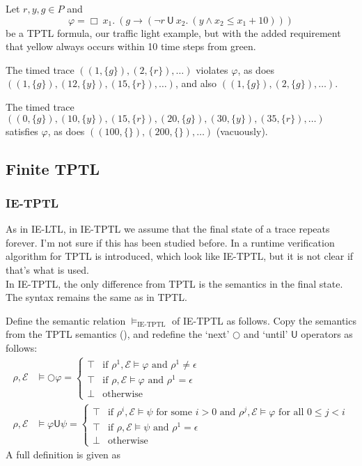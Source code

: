 \documentclass[a4paper]{article}
\newcommand{\U}{\mathsf{U}}
\newcommand{\tand}{\text{ and }}
\newcommand{\fsome}{\text{ for some }}
\newcommand{\fall}{\text{ for all }}
\newcommand{\eval}{\mathcal{E}}
\begin{document}
\begin{eg}\label{tptleg}
  Let $r,y,g\in P$ and \[\varphi = \Box ~x_1.~ (g \to (\neg r ~\U~ x_2.~ (y \land x_2 \leq x_1 + 10) ))\] be a TPTL formula, our traffic light example, but with the added requirement that yellow always occurs within 10 time steps from green.

  The timed trace $((1,\{g\}),(2,\{r\}),\dots)$ violates $\varphi$, as does $((1,\{g\}),(12,\{y\}),(15,\{r\}),\dots)$, and also $((1,\{g\}),(2,\{g\}),\dots)$.

  The timed trace $((0,\{g\}),(10,\{y\}),(15,\{r\}),(20,\{g\}),(30,\{y\}),(35,\{r\}),\dots)$ satisfies $\varphi$, as does $((100,\{\}),(200,\{\}),\dots)$ (vacuously).

\end{eg}

\subsection{Finite TPTL}

\subsubsection{IE-TPTL} As in IE-LTL, in IE-TPTL we assume that the final state of a trace repeats forever. I'm not sure if this has been studied before. In \textcite{chai2013rewriting} a runtime verification algorithm for TPTL is introduced, which look like IE-TPTL, but it is not clear if that's what is used.\\
In IE-TPTL, the only difference from TPTL is the semantics in the final state. The syntax remains the same as in TPTL.

\begin{defn}\label{ietptlsem}

  Define the semantic relation $\vDash_{\text{IE-TPTL}}$ of IE-TPTL as follows. Copy the semantics from the TPTL semantics (), and redefine the `next' $\bigcirc$ and `until' $\U$ operators as follows:
  \begin{align*}
    \rho,\eval&\vDash \bigcirc \varphi =
    \begin{cases}
      \top &\text{if } \rho^1,\eval \vDash \varphi \tand \rho^1 \ne \epsilon\\
      \top &\text{if } \rho,\eval\vDash \varphi \tand \rho^1 = \epsilon\\
      \bot &\text{otherwise}
    \end{cases}\\
    \rho,\eval&\vDash \varphi \U \psi =
    \begin{cases}
      \top &\text{if } \rho^i,\eval \vDash \psi \fsome i > 0 \tand \rho^j,\eval \vDash \varphi \fall 0 \leq j < i\\
      \top &\text{if } \rho,\eval\vDash \psi \tand \rho^1 = \epsilon\\
      \bot &\text{otherwise}
    \end{cases}
  \end{align*}
  A full definition is given as 
\end{defn}
\end{document}
